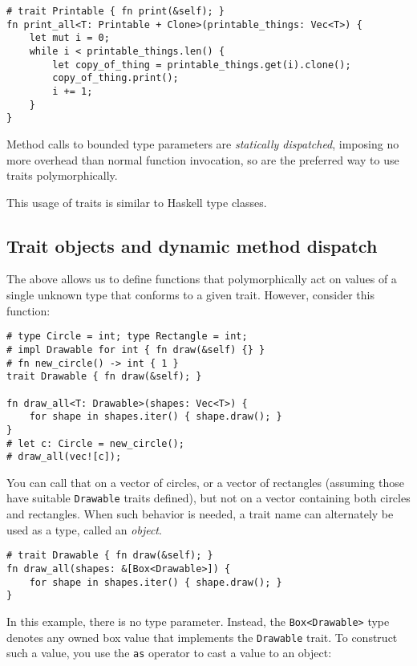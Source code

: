 \documentclass[]{article}
\begin{document}
\begin{verbatim}
# trait Printable { fn print(&self); }
fn print_all<T: Printable + Clone>(printable_things: Vec<T>) {
    let mut i = 0;
    while i < printable_things.len() {
        let copy_of_thing = printable_things.get(i).clone();
        copy_of_thing.print();
        i += 1;
    }
}
\end{verbatim}

Method calls to bounded type parameters are \emph{statically
dispatched}, imposing no more overhead than normal function invocation,
so are the preferred way to use traits polymorphically.

This usage of traits is similar to Haskell type classes.

\subsection{Trait objects and dynamic method
dispatch}\label{trait-objects-and-dynamic-method-dispatch}

The above allows us to define functions that polymorphically act on
values of a single unknown type that conforms to a given trait. However,
consider this function:

\begin{verbatim}
# type Circle = int; type Rectangle = int;
# impl Drawable for int { fn draw(&self) {} }
# fn new_circle() -> int { 1 }
trait Drawable { fn draw(&self); }

fn draw_all<T: Drawable>(shapes: Vec<T>) {
    for shape in shapes.iter() { shape.draw(); }
}
# let c: Circle = new_circle();
# draw_all(vec![c]);
\end{verbatim}

You can call that on a vector of circles, or a vector of rectangles
(assuming those have suitable \texttt{Drawable} traits defined), but not
on a vector containing both circles and rectangles. When such behavior
is needed, a trait name can alternately be used as a type, called an
\emph{object}.

\begin{verbatim}
# trait Drawable { fn draw(&self); }
fn draw_all(shapes: &[Box<Drawable>]) {
    for shape in shapes.iter() { shape.draw(); }
}
\end{verbatim}

In this example, there is no type parameter. Instead, the
\texttt{Box\textless{}Drawable\textgreater{}} type denotes any owned box
value that implements the \texttt{Drawable} trait. To construct such a
value, you use the \texttt{as} operator to cast a value to an object:
\end{document}
